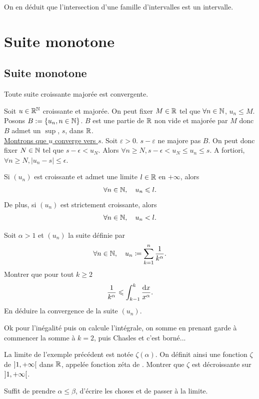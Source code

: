 \documentclass{magnolia}
\begin{document}
\begin{remarqueUnique}
\remarque On en déduit que l'intersection d'une famille d'intervalles est un intervalle.
\end{remarqueUnique}


\section{Suite monotone}

\subsection{Suite monotone}

\begin{theoreme}[nom={Théorème de la limite monotone}]
Toute suite croissante majorée est convergente.
\end{theoreme}

\begin{preuve}
Soit $u\in \R^{\N}$ croissante et majorée. On peut fixer $M\in\R$ tel que $\forall n\in \N$, $u_n\leq M$. Posons $B:=\ens{u_n, n\in \N}$. $B$ est une partie de $\R$ non vide et majorée par $M$ donc $B$ admet un $\sup$, $s$, dans $\R$.\\
\underline{Montrons que $u$ converge vers $s$}. Soit $\varepsilon>0$. $s-\varepsilon$ ne majore pas $B$. On peut donc fixer $N\in\N$ tel que $s-\epsilon<u_N$. Alors $\forall n\geq N, s-\epsilon<u_N\leq u_n\leq s$. A fortiori, $\forall n\geq N, |u_n-s|\leq \epsilon$.
\end{preuve}

\begin{remarqueUnique}
\remarque Si $(u_n)$ est croissante et admet une limite $l\in\R$ en $+\infty$, alors
  \[\forall n\in\N\qsep u_n\leq l.\]
  De plus, si $(u_n)$ est strictement croissante, alors
  \[\forall n\in\N\qsep u_n< l.\]
\end{remarqueUnique}


\begin{exos}
\exo Soit $\alpha>1$ et $(u_n)$ la suite définie par
  \[\forall n\in\N \qsep u_n\defeq\sum_{k=1}^n \frac{1}{k^\alpha}.\]
  Montrer que pour tout $k\geq 2$
  \[\frac{1}{k^\alpha}\leq\integinv{k-1}{k}{x^\alpha}{x}.\]
  En déduire la convergence de la suite $(u_n)$.
  \begin{sol}
  Ok pour l'inégalité puis on calcule l'intégrale, on somme en prenant garde à commencer la somme à $k=2$, puis Chasles et c'est borné...
  \end{sol}
\exo La limite de l'exemple précédent est notée $\zeta(\alpha)$. On
  définit ainsi une fonction $\zeta$ de $\intero{1}{+\infty}$ dans $\R$,
  appelée fonction zéta de . Montrer que $\zeta$ est
  décroissante sur $\intero{1}{+\infty}$.
  \begin{sol}
  Suffit de prendre $\alpha\leq \beta$, d'écrire les choses et de passer à la limite.
  \end{sol}
\end{exos}
\end{document}
